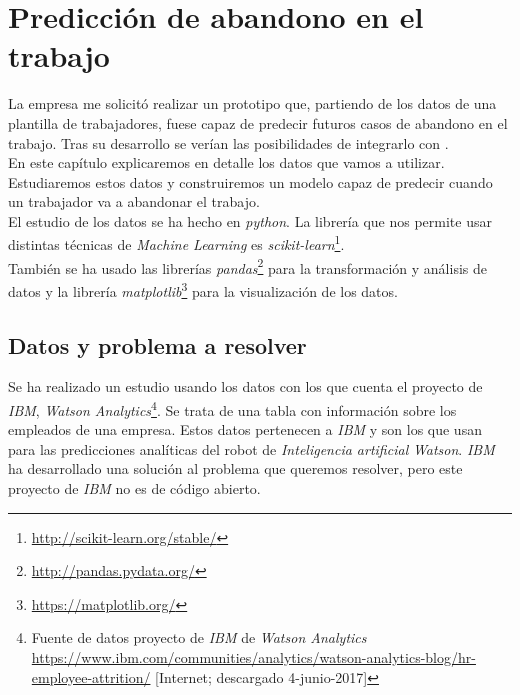 \chapter{Predicción de abandono en el trabajo}

La empresa me solicitó realizar un prototipo que, partiendo de los datos de una plantilla de trabajadores, fuese capaz de predecir futuros casos de abandono en el trabajo.
Tras su desarrollo se verían las posibilidades de integrarlo con \wday{}.\\

En este capítulo explicaremos en detalle los datos que vamos a utilizar. Estudiaremos estos datos y construiremos un modelo capaz de predecir cuando un trabajador va a abandonar el trabajo.\\



El estudio de los datos se ha hecho en \textit{python}. La librería que nos permite usar distintas técnicas de \textit{Machine Learning} es \textit{scikit-learn}\footnote{\url{http://scikit-learn.org/stable/}}.\\

También se ha usado las librerías \textit{pandas}\footnote{\url{http://pandas.pydata.org/}} para la transformación y análisis de datos y la librería \textit{matplotlib}\footnote{\url{https://matplotlib.org/}} para la visualización de los datos.\\







\section{Datos y problema a resolver}

Se ha realizado un estudio usando los datos con los que cuenta el proyecto de \textit{IBM}, \textit{Watson Analytics}\footnote{Fuente de datos proyecto de \textit{IBM} de \textit{Watson Analytics} \url{https://www.ibm.com/communities/analytics/watson-analytics-blog/hr-employee-attrition/} [Internet; descargado 4-junio-2017]}.
Se trata de una tabla con información sobre los empleados de una empresa.
Estos datos pertenecen a \textit{IBM} y son los que usan para las predicciones analíticas del robot de \textit{Inteligencia artificial} \textit{Watson}. \textit{IBM} ha desarrollado una solución al problema que queremos resolver, pero este proyecto de \textit{IBM} no es de código abierto.\\

